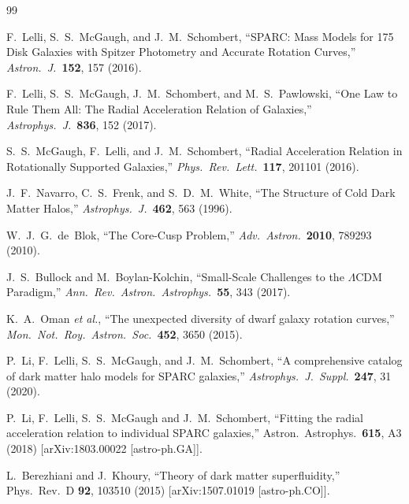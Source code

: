 \documentclass[11pt,a4paper]{article}
\begin{document}


\begin{thebibliography}{99}

F.~Lelli, S.~S.~McGaugh, and J.~M.~Schombert,
``SPARC: Mass Models for 175 Disk Galaxies with Spitzer Photometry
and Accurate Rotation Curves,''
\textit{Astron.\ J.}\ \textbf{152}, 157 (2016).

F.~Lelli, S.~S.~McGaugh, J.~M.~Schombert, and M.~S.~Pawlowski,
``One Law to Rule Them All: The Radial Acceleration Relation of Galaxies,''
\textit{Astrophys.\ J.}\ \textbf{836}, 152 (2017).

S.~S.~McGaugh, F.~Lelli, and J.~M.~Schombert,
``Radial Acceleration Relation in Rotationally Supported Galaxies,''
\textit{Phys.\ Rev.\ Lett.}\ \textbf{117}, 201101 (2016).

J.~F.~Navarro, C.~S.~Frenk, and S.~D.~M.~White,
``The Structure of Cold Dark Matter Halos,''
\textit{Astrophys.\ J.}\ \textbf{462}, 563 (1996).

W.~J.~G.~de~Blok,
``The Core-Cusp Problem,''
\textit{Adv.\ Astron.}\ \textbf{2010}, 789293 (2010).

J.~S.~Bullock and M.~Boylan-Kolchin,
``Small-Scale Challenges to the $\Lambda$CDM Paradigm,''
\textit{Ann.\ Rev.\ Astron.\ Astrophys.}\ \textbf{55}, 343 (2017).

K.~A.~Oman \textit{et al.},
``The unexpected diversity of dwarf galaxy rotation curves,''
\textit{Mon.\ Not.\ Roy.\ Astron.\ Soc.}\ \textbf{452}, 3650 (2015).

P.~Li, F.~Lelli, S.~S.~McGaugh, and J.~M.~Schombert,
``A comprehensive catalog of dark matter halo models for SPARC galaxies,''
\textit{Astrophys.\ J.\ Suppl.}\ \textbf{247}, 31 (2020).

P.~Li, F.~Lelli, S.~S.~McGaugh and J.~M.~Schombert,
``Fitting the radial acceleration relation to individual SPARC
galaxies,''
Astron.\ Astrophys.\ \textbf{615}, A3 (2018)
[arXiv:1803.00022 [astro-ph.GA]].

L.~Berezhiani and J.~Khoury,
``Theory of dark matter superfluidity,''
Phys.\ Rev.\ D \textbf{92}, 103510 (2015)
[arXiv:1507.01019 [astro-ph.CO]].


\end{thebibliography}
\end{document}

